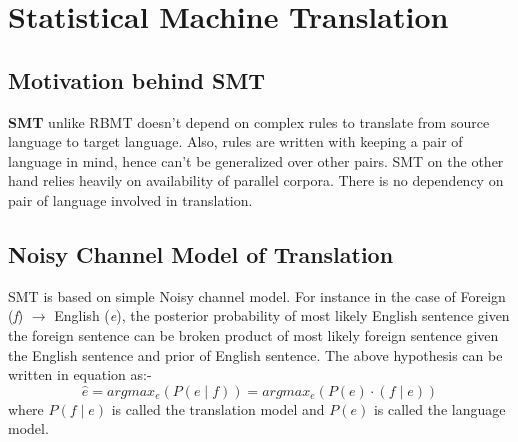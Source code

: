 \chapter{Statistical Machine Translation}
\label{chap:SMT}
\section{Motivation behind SMT}
	\textbf{SMT} unlike RBMT doesn't depend on complex rules to translate from source language to target language. Also, rules are written with keeping a pair of language in mind, hence can't be generalized over other pairs. SMT on the other hand relies heavily on availability of parallel corpora. There is no dependency on pair of language involved in translation. 	

\section{Noisy Channel Model of Translation}
SMT is based on simple Noisy channel model. For instance in the case of Foreign (\textit{f}) $\rightarrow$ English (\textit{e}), the posterior probability of most likely English sentence given the foreign sentence can be broken product of most likely foreign sentence given the English sentence and prior of English sentence. The above hypothesis can be written in equation as:-\\
\begin{equation}
\hat{e} = arg max_{e}(P(e\mid f)) = arg max_{e}(P(e)\cdot(f\mid e))
\end{equation}
where $P(f\mid e)$ is called the translation model and $P(e)$ is called the language model.


